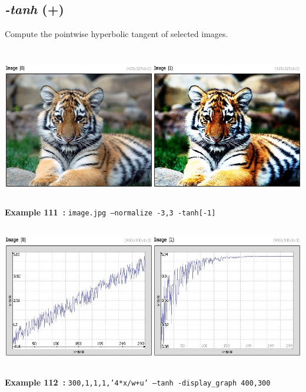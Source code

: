 \documentclass[a4paper,11pt,twoside]{book}
\begin{document}
\subsection{\emph{-tanh} (+)}\vspace*{-0.5em}
Compute the pointwise hyperbolic tangent of selected images.
\begin{center}\includegraphics[keepaspectratio=true,height=7cm,width=\textwidth]{img/gmic_def111.jpg}\\
{\footnotesize \textbf{Example 111~:} \texttt{image.jpg --normalize -3,3 -tanh[-1]}}
\\\includegraphics[keepaspectratio=true,height=7cm,width=\textwidth]{img/gmic_def112.jpg}\\
{\footnotesize \textbf{Example 112~:} \texttt{300,1,1,1,'4*x/w+u' --tanh -display\_graph 400,300}}
\end{center}
\end{document}
